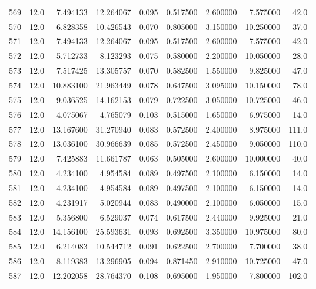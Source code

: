 \begin{tabular}{lrrrrrrrr}
569  &   12.0 &   7.494133 &  12.264067 &  0.095 &  0.517500 &  2.600000 &   7.575000 &   42.0 \\
570  &   12.0 &   6.828358 &  10.426543 &  0.070 &  0.805000 &  3.150000 &  10.250000 &   37.0 \\
571  &   12.0 &   7.494133 &  12.264067 &  0.095 &  0.517500 &  2.600000 &   7.575000 &   42.0 \\
572  &   12.0 &   5.712733 &   8.123293 &  0.075 &  0.580000 &  2.200000 &  10.050000 &   28.0 \\
573  &   12.0 &   7.517425 &  13.305757 &  0.070 &  0.582500 &  1.550000 &   9.825000 &   47.0 \\
574  &   12.0 &  10.883100 &  21.963449 &  0.078 &  0.647500 &  3.095000 &  10.150000 &   78.0 \\
575  &   12.0 &   9.036525 &  14.162153 &  0.079 &  0.722500 &  3.050000 &  10.725000 &   46.0 \\
576  &   12.0 &   4.075067 &   4.765079 &  0.103 &  0.515000 &  1.650000 &   6.975000 &   14.0 \\
577  &   12.0 &  13.167600 &  31.270940 &  0.083 &  0.572500 &  2.400000 &   8.975000 &  111.0 \\
578  &   12.0 &  13.036100 &  30.966639 &  0.085 &  0.572500 &  2.450000 &   9.050000 &  110.0 \\
579  &   12.0 &   7.425883 &  11.661787 &  0.063 &  0.505000 &  2.600000 &  10.000000 &   40.0 \\
580  &   12.0 &   4.234100 &   4.954584 &  0.089 &  0.497500 &  2.100000 &   6.150000 &   14.0 \\
581  &   12.0 &   4.234100 &   4.954584 &  0.089 &  0.497500 &  2.100000 &   6.150000 &   14.0 \\
582  &   12.0 &   4.231917 &   5.020944 &  0.083 &  0.490000 &  2.100000 &   6.050000 &   15.0 \\
583  &   12.0 &   5.356800 &   6.529037 &  0.074 &  0.617500 &  2.440000 &   9.925000 &   21.0 \\
584  &   12.0 &  14.156100 &  25.593631 &  0.093 &  0.692500 &  3.350000 &  10.975000 &   80.0 \\
585  &   12.0 &   6.214083 &  10.544712 &  0.091 &  0.622500 &  2.700000 &   7.700000 &   38.0 \\
586  &   12.0 &   8.119383 &  13.296905 &  0.094 &  0.871450 &  2.910000 &  10.725000 &   47.0 \\
587  &   12.0 &  12.202058 &  28.764370 &  0.108 &  0.695000 &  1.950000 &   7.800000 &  102.0 \\

\end{tabular}
